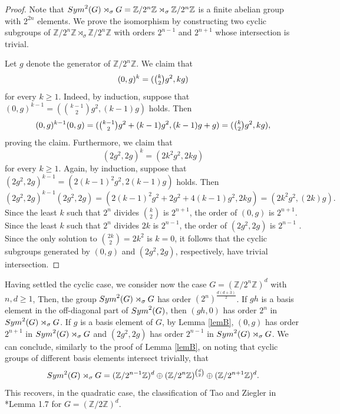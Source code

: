 \documentclass[a4paper,11pt]{amsproc}
\theoremstyle{plain}
\theoremstyle{definition}
\begin{document}
\begin{proof}
    Note that ${\rm Sym}^2(G)\rtimes_\sigma G=\mathbb{Z}/2^n\mathbb{Z}\rtimes_\sigma \mathbb{Z}/2^n\mathbb{Z}$ is a finite abelian group with $2^{2n}$ elements. We prove the isomorphism by constructing two cyclic subgroups of $\mathbb{Z}/2^n\mathbb{Z}\rtimes_\sigma \mathbb{Z}/2^n\mathbb{Z}$ with orders $2^{n-1}$ and $2^{n+1}$ whose intersection is trivial. 
    
    Let $g$ denote the generator of $\mathbb{Z}/2^n\mathbb{Z}$. We claim that $$(0,g)^k=(\tbinom{k}{2} g^2, kg)$$ for every $k\geq 1$. Indeed, by induction, suppose that $(0,g)^{k-1}=(\binom{k-1}{2} g^2, (k-1)g)$ holds. Then 
    \[
    (0,g)^{k-1}(0,g)= (\tbinom{k-1}{2} g^2 + (k-1)g^2, (k-1)g+g) = (\tbinom{k}{2} g^2, kg),
    \]
    proving the claim. 
    Furthermore, we claim that $$(2g^2,2g)^k=(2k^2 g^2, 2k g)$$ for every $k\geq 1$. Again, by induction, suppose that $(2g^2,2g)^{k-1}=(2(k-1)^2 g^2,2(k-1)g)$ holds. Then 
    \[
         (2g^2,2g)^{k-1}(2g^2,2g)=(2(k-1)^2 g^2+ 2g^2+ 4(k-1)g^2,2kg) = (2k^2 g^2,(2k)g).
    \]
    Since the least $k$ such that $2^n$ divides $\binom{k}{2}$ is $2^{n+1}$, the order of $(0,g)$ is  $2^{n+1}$. Since the least $k$ such that $2^n$ divides $2k$ is $2^{n-1}$, the order of $(2g^2,2g)$ is $2^{n-1}$ . Since the only solution to $\binom{2k}{2}=2k^2$ is $k=0$, it follows that the cyclic subgroups generated by $(0,g)$ and $(2g^2,2g)$, respectively, have trivial intersection. 
\end{proof}

Having settled the cyclic case, we consider now the case $G= (\mathbb{Z}/2^{n}\mathbb{Z})^d$ with $n,d\geq 1$, Then, the group ${\rm Sym}^2(G)\rtimes_\sigma G$
has order $(2^n)^{\frac{d(d+3)}{2}}$.
If $gh$ is a basis element in the off-diagonal part of ${\rm Sym}^2(G)$, then $(gh,0)$ has order $2^n$ in ${\rm Sym}^2(G)\rtimes_\sigma G$. 
If $g$ is a basis element of $G$, by Lemma \ref{lemB}, $(0,g)$ has order $2^{n+1}$ in ${\rm Sym}^2(G)\rtimes_\sigma G$ and $(2g^2,2g)$ has order $2^{n-1}$ in ${\rm Sym}^2(G)\rtimes_\sigma G$. We can conclude, similarly to the proof of Lemma \ref{lemB}, on noting that cyclic groups of different basis elements intersect trivially,  that 
\[
  {\rm Sym}^2(G)\rtimes_\sigma G = (\mathbb{Z}/2^{n-1}\mathbb{Z})^d  \oplus (\mathbb{Z}/2^{n}\mathbb{Z})^{\binom{d}{2}}\oplus (\mathbb{Z}/2^{n+1}\mathbb{Z})^d.
 \]
This recovers, in the quadratic case, the classification of Tao and Ziegler in \cite{tz2}*{Lemma 1.7} for $G= (\mathbb{Z}/2\mathbb{Z})^d$.  
\end{document}
